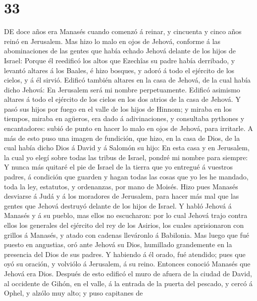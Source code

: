 \hypertarget{section-32}{%
\section{33}\label{section-32}}

 DE doce años era Manasés cuando comenzó á reinar, y
cincuenta y cinco años reinó en Jerusalem.  Mas hizo lo
malo en ojos de Jehová, conforme á las abominaciones de las gentes que
había echado Jehová delante de los hijos de Israel: 
Porque él reedificó los altos que Ezechîas su padre había derribado, y
levantó altares á los Baales, é hizo bosques, y adoró á todo el ejército
de los cielos, y á él sirvió.  Edificó también altares en
la casa de Jehová, de la cual había dicho Jehová: En Jerusalem será mi
nombre perpetuamente.  Edificó asimismo altares á todo el
ejército de los cielos en los dos atrios de la casa de Jehová.
 Y pasó sus hijos por fuego en el valle de los hijos de
Hinnom; y miraba en los tiempos, miraba en agüeros, era dado á
adivinaciones, y consultaba pythones y encantadores: subió de punto en
hacer lo malo en ojos de Jehová, para irritarle.  A más de
esto puso una imagen de fundición, que hizo, en la casa de Dios, de la
cual había dicho Dios á David y á Salomón su hijo: En esta casa y en
Jerusalem, la cual yo elegí sobre todas las tribus de Israel, pondré mi
nombre para siempre:  Y nunca más quitaré el pie de Israel
de la tierra que yo entregué á vuestros padres, á condición que guarden
y hagan todas las cosas que yo les he mandado, toda la ley, estatutos, y
ordenanzas, por mano de Moisés.  Hizo pues Manasés
desviarse á Judá y á los moradores de Jerusalem, para hacer más mal que
las gentes que Jehová destruyó delante de los hijos de Israel.
 Y habló Jehová á Manasés y á su pueblo, mas ellos no
escucharon: por lo cual Jehová trajo contra ellos los generales del
ejército del rey de los Asirios, los cuales aprisionaron con grillos á
Manasés, y atado con cadenas lleváronlo á Babilonia.  Mas
luego que fué puesto en angustias, oró ante Jehová su Dios, humillado
grandemente en la presencia del Dios de sus padres.  Y
habiendo á él orado, fué atendido; pues que oyó su oración, y volviólo á
Jerusalem, á su reino. Entonces conoció Manasés que Jehová era Dios.
 Después de esto edificó el muro de afuera de la ciudad
de David, al occidente de Gihón, en el valle, á la entrada de la puerta
del pescado, y cercó á Ophel, y alzólo muy alto; y puso capitanes de
